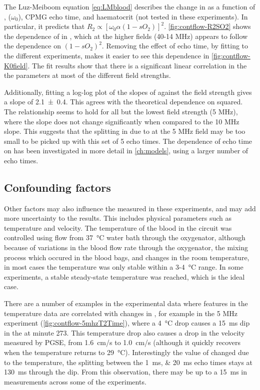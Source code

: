 The Luz-Meiboom equation \autoref{eq:LMblood} describes the change in \Ttwo as a function of \SOtwo, \Bzero ($\omega_0$), CPMG echo time, and haematocrit (not tested in these experiments).
In particular, it predicts that $R_2 \propto \left[\omega_0\alpha(1-sO_2)\right]^2$.
\autoref{fig:contflow-R2SO2} shows the dependence of \Rtwo in \SOtwo, which at the higher fields (40-14 MHz) appears to follow the dependence on $(1-sO_2)^2$.
Removing the effect of echo time, by fitting \Kzero to the different experiments, makes it easier to see this dependence in \autoref{fig:contflow-K0field}.
The fit results show that there is a significant linear correlation in the the parameters at most of the different field strengths.

Additionally, fitting a log-log plot of the slopes of \Kzero against the field strength \Bzero gives a slope of \num{2.1\pm0.4}.
This agrees with the theoretical dependence on \Bzero squared.
The relationship seems to hold for all but the lowest field strength (5 MHz), where the slope does not change significantly when compared to the 10 MHz slope.
This suggests that the splitting  in \Ttwo due to \SOtwo at the 5 MHz field may be too small to be picked up with this set of 5 echo times.
The dependence of echo time on \Ttwo has been investigated in more detail in \autoref{ch:models}, using a larger number of echo times.

\subsection{Confounding factors}

Other factors may also influence the \Ttwo measured in these experiments, and may add more uncertainty to the results.
This includes physical parameters such as temperature and velocity.
The temperature of the blood in the circuit was controlled using flow from \SI{37}{\celsius} water bath through the oxygenator, although because of variations in the blood flow rate through the oxygenator, the mixing process which occured in the blood bags, and changes in the room temperature, in most cases the temperature was only stable within a 3-\SI{4}{\celsius} range.
In some experiments, a stable steady-state temperature was reached, which is the ideal case.

There are a number of examples in the experimental data where features in the temperature data are correlated with changes in \Ttwo, for example in the 5 MHz experiment (\autoref{fig:contflow-5mhzT2Time}), where a \SI{4}{\celsius} drop causes a \SI{15}{ms} dip in the \Ttwo at minute 273.
This temperature drop also causes a drop in the velocity measured by PGSE, from \SI{1.6}{cm/s} to \SI{1.0}{cm/s} (although it quickly recovers when the temperature returns to \SI{29}{\celsius}).
Interestingly the value of \Ttwo changed due to the temperature, the splitting between the \SIlist{1;20}{ms} echo times stays at \SI{130}{ms} through the dip.
From this observation, there may be  up to a \SI{15}{ms} in \Ttwo measurements across some of the experiments.

